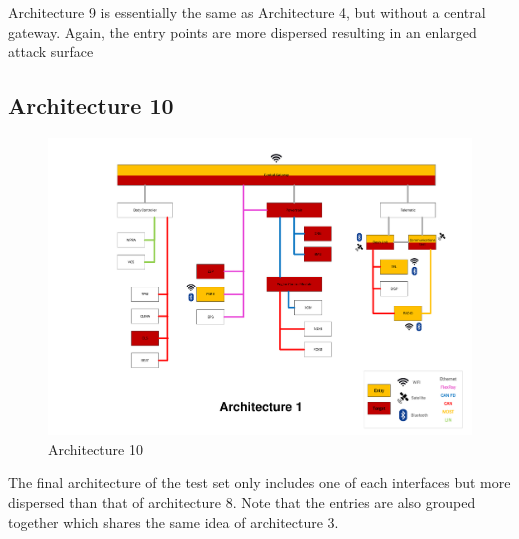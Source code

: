 Architecture 9 is essentially the same as Architecture 4, but without a central gateway.
Again, the entry points are more dispersed resulting in an enlarged attack surface \par


\subsection*{Architecture 10}
\label{sec:arch10}

\begin{figure}[h!]
    \caption{Architecture 10}
    \includegraphics[width=\textwidth, page=10]{../Architectures-survey.pdf}
\end{figure}

The final architecture of the test set only includes one of each interfaces but more dispersed than that of architecture 8.
Note that the entries are also grouped together which shares the same idea of architecture 3.\\

